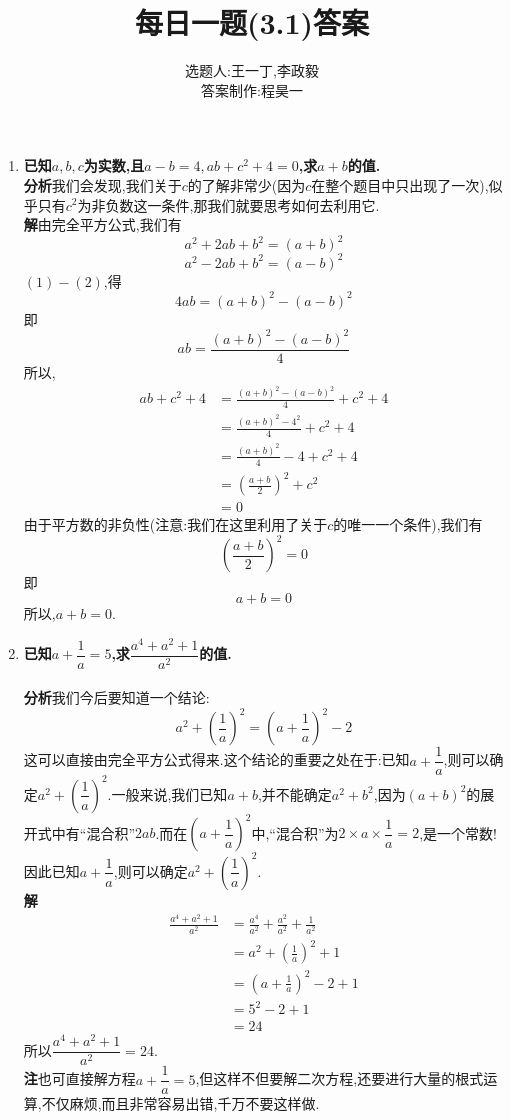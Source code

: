 \documentclass[UTF8]{ctexart}
\title{每日一题(3.1)答案}
\author{选题人:王一丁,李政毅\\答案制作:程昊一}
\begin{document}
\maketitle
\begin{enumerate}
\item \textbf{已知$a,b,c$为实数,且$a-b=4,ab+c^2+4=0$,求$a+b$的值.}\\
\hspace*{2em}\textbf{分析}\quad 我们会发现,我们关于$c$的了解非常少(因为$c$在整个题目中只出现了一次),似乎只有$c^2$为非负数这一条件,那我们就要思考如何去利用它.\\
\hspace*{2em}\textbf{解}\quad 由完全平方公式,我们有
\begin{equation}
a^2+2ab+b^2=(a+b)^2
\end{equation}\begin{equation}
a^2-2ab+b^2=(a-b)^2
\end{equation}
$(1)-(2)$,得
\[4ab=(a+b)^2-(a-b)^2\]
即
\[ab=\frac{(a+b)^2-(a-b)^2}{4}\]
\hspace*{2em}所以,
\begin{align*}
ab+c^2+4&=\frac{(a+b)^2-(a-b)^2}{4}+c^2+4\\
&=\frac{(a+b)^2-4^2}{4}+c^2+4\\
&=\frac{(a+b)^2}{4}-4+c^2+4\\
&=\left(\frac{a+b}{2}\right)^2+c^2\\
&=0
\end{align*}
由于平方数的非负性(注意:我们在这里利用了关于$c$的唯一一个条件),我们有
\[\left(\frac{a+b}{2}\right)^2=0\]
即\[a+b=0\]
\hspace*{2em}所以,$a+b=0$.
\item \textbf{已知$a+\dfrac{1}{a}=5$,求$\dfrac{a^4+a^2+1}{a^2}$的值.}\\
\quad\\
\hspace*{2em}\textbf{分析}\quad 我们今后要知道一个结论:
\[a^2+\left(\frac{1}{a}\right)^2=(a+\frac{1}{a})^2-2\]
\hspace*{2em}这可以直接由完全平方公式得来.这个结论的重要之处在于:已知$a+\dfrac{1}{a}$,则可以确定$a^2+\left(\dfrac{1}{a}\right)^2$.一般来说,我们已知$a+b$,并不能确定$a^2+b^2$,因为$(a+b)^2$的展开式中有“混合积”$2ab$.而在$\left(a+\dfrac{1}{a}\right)^2$中,“混合积”为$2\times a\times \dfrac{1}{a}=2$,是一个常数!因此已知$a+\dfrac{1}{a}$,则可以确定$a^2+\left(\dfrac{1}{a}\right)^2$.\\
\hspace*{2em}\textbf{解}
\begin{align*}
\frac{a^4+a^2+1}{a^2}&=\frac{a^4}{a^2}+\frac{a^2}{a^2}+\frac{1}{a^2}\\
&=a^2+\left(\frac{1}{a}\right)^2+1\\
&=\left(a+\frac{1}{a}\right)^2-2+1\\
&=5^2-2+1\\
&=24
\end{align*}
\hspace*{2em}所以$\dfrac{a^4+a^2+1}{a^2}=24$.\\
\hspace*{2em}\textbf{注}\quad 也可直接解方程$a+\dfrac{1}{a}=5$,但这样不但要解二次方程,还要进行大量的根式运算,不仅麻烦,而且非常容易出错,千万不要这样做.
\end{enumerate}
\end{document}
